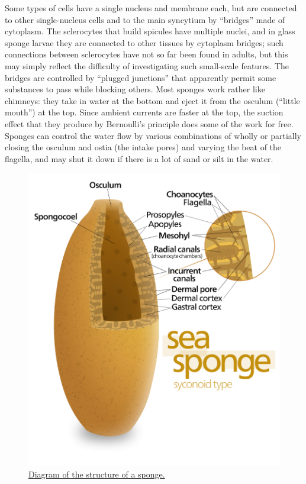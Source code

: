 Some types of cells have a single nucleus and membrane each, but are connected to other single-nucleus cells and to the main syncytium by ``bridges'' made of cytoplasm. The sclerocytes that build spicules have multiple nuclei, and in glass sponge larvae they are connected to other tissues by cytoplasm bridges; such connections between sclerocytes have not so far been found in adults, but this may simply reflect the difficulty of investigating such small-scale features. The bridges are controlled by ``plugged junctions'' that apparently permit some substances to pass while blocking others.
Most sponges work rather like chimneys: they take in water at the bottom and eject it from the osculum (``little mouth'') at the top. Since ambient currents are faster at the top, the suction effect that they produce by Bernoulli's principle does some of the work for free. Sponges can control the water flow by various combinations of wholly or partially closing the osculum and ostia (the intake pores) and varying the beat of the flagella, and may shut it down if there is a lot of sand or silt in the water.



\begin{figure}

{\centering \includegraphics[width=0.7\linewidth]{./figures/animals/Sea_sponge_diagram} 

}

\caption{\href{https://commons.wikimedia.org/wiki/File:Sea_sponge_diagram.svg}{Diagram of the structure of a sponge.}}\label{fig:spongediagram}
\end{figure}

